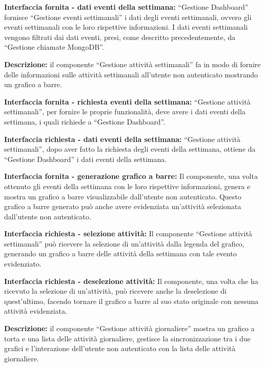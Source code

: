 \begin{listaPersonale}[DCI]{}
    \textbf{Interfaccia fornita - dati eventi della settimana:} “Gestione Dashboard” fornisce  “Gestione eventi settimanali” i dati degli eventi settimanali, ovvero gli eventi settimanali con le loro rispettive informazioni. I dati eventi settimanali vengono filtrati dai dati eventi, presi, come descritto precedentemente, da “Gestione chiamate MongoDB”.



    \textbf{Descrizione:} il componente “Gestione attività settimanali” fa in modo di fornire delle informazioni sulle attività settimanali all'utente non autenticato mostrando un grafico a barre.

    \textbf{Interfaccia fornita - richiesta eventi della settimana:} “Gestione attività settimanali”, per fornire le proprie funzionalità, deve avere i dati eventi della settimana, i quali richiede a “Gestione Dashboard”.

    \textbf{Interfaccia richiesta - dati eventi della settimana:} “Gestione attività settimanali”, dopo aver fatto la richiesta degli eventi della settimana, ottiene da “Gestione Dashboard” i dati eventi della settimana.

    \textbf{Interfaccia fornita - generazione grafico a barre:} Il componente, una volta ottenuto gli eventi della settimana con le loro rispettive informazioni, genera e mostra un grafico a barre visualizzabile dall'utente non autenticato. Questo grafico a barre generato può anche avere evidenziata un'attività selezionata dall'utente non autenticato.

    \textbf{Interfaccia richiesta - selezione attività:} Il componente “Gestione attività settimanali” può ricevere la selezione di un'attività dalla legenda del grafico, generando un grafico a barre delle attività della settimana con tale evento evidenziato.

    \textbf{Interfaccia richiesta - deselezione attività:} Il componente, una volta che ha ricevuto la selezione di un'attività, può ricevere anche la deselezione di quest'ultimo, facendo tornare il grafico a barre al suo stato originale con nessuna attività evidenziata.



    \textbf{Descrizione:} il componente “Gestione attività giornaliere” mostra un grafico a torta e una lista delle attività giornaliere, gestisce la sincronizzazione tra i due grafici e l'interazione dell'utente non autenticato con la lista delle attività giornaliere.


\end{listaPersonale}
